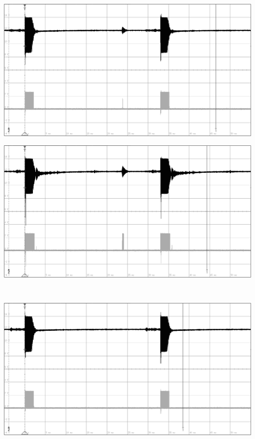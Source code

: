 \begin{minipage}{0.46\textwidth}
\includegraphics[width=1\textwidth%
]{Abbildungen/MessungenP2/5V/4m.PNG}
\end{minipage}\qquad
\begin{minipage}{0.46\textwidth}
\includegraphics[width=1\textwidth%
]{Abbildungen/MessungenP2/10V/4m.PNG}
\end{minipage}\\
\begin{minipage}{0.46\textwidth}
\includegraphics[width=1\textwidth%
]{Abbildungen/MessungenP2/5V/5m.PNG}
\end{minipage}\qquad

